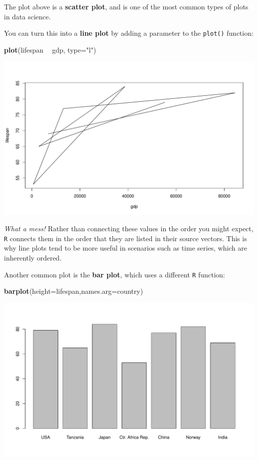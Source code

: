 \documentclass[
]{book}
\newenvironment{Shaded}{\begin{snugshade}}{\end{snugshade}}
\newcommand{\DataTypeTok}[1]{\textcolor[rgb]{0.13,0.29,0.53}{#1}}
\newcommand{\KeywordTok}[1]{\textcolor[rgb]{0.13,0.29,0.53}{\textbf{#1}}}
\newcommand{\NormalTok}[1]{#1}
\newcommand{\OperatorTok}[1]{\textcolor[rgb]{0.81,0.36,0.00}{\textbf{#1}}}
\newcommand{\StringTok}[1]{\textcolor[rgb]{0.31,0.60,0.02}{#1}}
\begin{document}
The plot above is a \textbf{scatter plot}, and is one of the most common types of plots in data science.

You can turn this into a \textbf{line plot} by adding a parameter to the \texttt{plot()} function:

\begin{Shaded}
\begin{Highlighting}[]
\KeywordTok{plot}\NormalTok{(lifespan }\OperatorTok{~}\StringTok{ }\NormalTok{gdp, }\DataTypeTok{type=}\StringTok{"l"}\NormalTok{)}
\end{Highlighting}
\end{Shaded}

\includegraphics{figures/unnamed-chunk-84-1.pdf}

\emph{What a mess!} Rather than connecting these values in the order you might expect, \texttt{R} connects them in the order that they are listed in their source vectors. This is why line plots tend to be more useful in scenarios such as time series, which are inherently ordered.

Another common plot is the \textbf{bar plot}, which uses a different \texttt{R} function:

\begin{Shaded}
\begin{Highlighting}[]
\KeywordTok{barplot}\NormalTok{(}\DataTypeTok{height=}\NormalTok{lifespan,}\DataTypeTok{names.arg=}\NormalTok{country)}
\end{Highlighting}
\end{Shaded}

\includegraphics{figures/unnamed-chunk-85-1.pdf}
\end{document}
